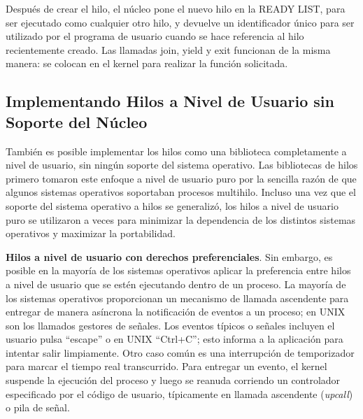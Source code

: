 \documentclass[10pt]{book}
\begin{document}
Después de crear el hilo, el núcleo pone el nuevo hilo en la READY LIST, para ser ejecutado como cualquier otro hilo, y devuelve un identificador único para ser utilizado por el programa de usuario cuando se hace referencia al hilo recientemente creado. Las llamadas {\mf join}, {\mf yield} y {\mf exit} funcionan de la misma manera: se colocan en el kernel para realizar la función solicitada.

\subsection{Implementando Hilos a Nivel de Usuario sin Soporte del Núcleo}
También es posible implementar los hilos como una biblioteca completamente a nivel de usuario, sin ningún soporte del sistema operativo. Las bibliotecas de hilos primero tomaron este enfoque a nivel de usuario puro por la sencilla razón de que algunos sistemas operativos soportaban procesos multihilo. Incluso una vez que el soporte del sistema operativo a hilos se generalizó, los hilos a nivel de usuario puro se utilizaron a veces para minimizar la dependencia de los distintos sistemas operativos y maximizar la portabilidad.

\textbf{Hilos a nivel de usuario con derechos preferenciales}. Sin embargo, es posible en la mayoría de los sistemas operativos aplicar la preferencia entre hilos a nivel de usuario que se estén ejecutando dentro de un proceso. La mayoría de los sistemas operativos proporcionan un mecanismo de llamada ascendente para entregar de manera asíncrona la notificación de eventos a un proceso; en UNIX son los llamados gestores de señales. Los eventos típicos o señales incluyen el usuario pulsa ``escape'' o en UNIX ``Ctrl+C''; esto informa a la aplicación para intentar salir limpiamente. Otro caso común es una interrupción de temporizador para marcar el tiempo real transcurrido. Para entregar un evento, el kernel suspende la ejecución del proceso y luego se reanuda corriendo un controlador especificado por el código de usuario, típicamente en llamada ascendente (\textit{upcall}) o pila de señal.
\end{document}
